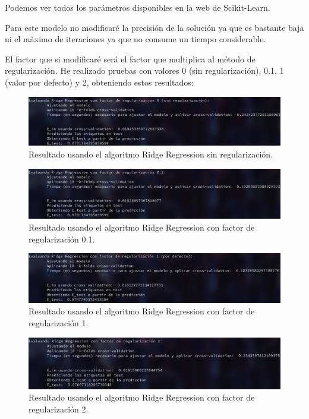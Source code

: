 \documentclass[12pt, spanish]{article}
\begin{document}
Podemos ver todos los parámetros disponibles en la web de Scikit-Learn\cite{ridgeReg}.


Para este modelo no modificaré la precisión de la solución ya que es bastante baja ni el máximo de iteraciones ya que no consume un tiempo considerable.

El factor que si modificaré será el factor que multiplica al método de regularización. He realizado pruebas con valores 0 (sin regularización), 0.1, 1 (valor por defecto) y 2, obteniendo estos resultados:



\begin{figure}[H]
	\centering
	\includegraphics[scale=0.45]{regresion/ridge0.png}
	\caption{Resultado usando el algoritmo Ridge Regression sin regularización.}
	\label{ridge0}
\end{figure}


\begin{figure}[H]
	\centering
	\includegraphics[scale=0.45]{regresion/ridge01.png}
	\caption{Resultado usando el algoritmo Ridge Regression con factor de regularización 0.1.}
	\label{ridgereg01}
\end{figure}



\begin{figure}[H]
	\centering
	\includegraphics[scale=0.45]{regresion/ridge1.png}
	\caption{Resultado usando el algoritmo Ridge Regression con factor de regularización 1.}
	\label{ridgereg1}
\end{figure}



\begin{figure}[H]
	\centering
	\includegraphics[scale=0.45]{regresion/ridge2.png}
	\caption{Resultado usando el algoritmo Ridge Regression con factor de regularización 2.}
	\label{ridgereg2}
\end{figure}
\end{document}
